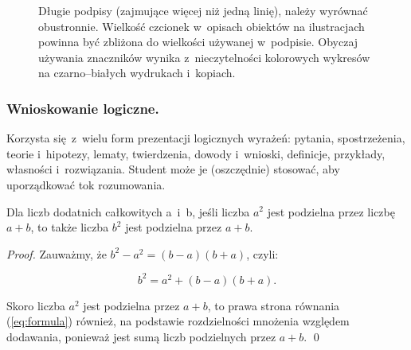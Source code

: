 \begin{figure}[!h]
	\centering
	\caption{Długie podpisy (zajmujące więcej niż jedną linię), należy wyrównać obustronnie. Wielkość czcionek w~opisach obiektów na ilustracjach powinna być zbliżona do wielkości używanej w~podpisie. Obyczaj używania znaczników wynika z~nieczytelności kolorowych wykresów na czarno--białych wydrukach i~kopiach.}
	\label{fig:stats}
	\vspace{-20pt}
\end{figure}

\subsubsection{Wnioskowanie logiczne.}
\label{subsubsec:logic}

Korzysta się z~wielu form prezentacji logicznych wyrażeń: pytania, spostrzeżenia, teorie i~hipotezy, lematy, twierdzenia, dowody i~wnioski, definicje, przykłady, własności i~rozwiązania. Student może je (oszczędnie) stosować, aby uporządkować tok rozumowania.

\begin{claim}
	Dla liczb dodatnich całkowitych a~i~b, jeśli liczba $a^{2}$ jest podzielna przez liczbę $a+b$, to także liczba $b^{2}$ jest podzielna przez $a+b$.
\end{claim}
\begin{proof}
	Zauważmy, że $b^{2} - a^{2} = (b-a)(b+a)$, czyli:

	\begin{equation} \label{eq:formula}
		b^{2} = a^{2} + (b-a)(b+a).
	\end{equation}

	\noindent Skoro liczba $a^{2}$ jest podzielna przez $a+b$, to prawa strona równania (\ref{eq:formula}) również, na podstawie rozdzielności mnożenia względem dodawania, ponieważ jest sumą liczb podzielnych przez $a+b$. \qed
\end{proof}

